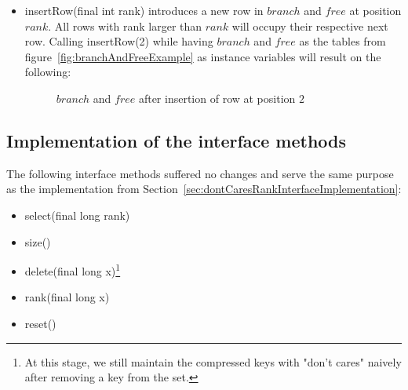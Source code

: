 \begin{itemize}
    \item
    {\ttfamily insertRow(final int rank)} introduces a new row in $branch$ and $free$ at position $rank$. All rows with rank larger than $rank$ will occupy their respective next row. Calling {\ttfamily insertRow(2)} while having $branch$ and $free$ as the tables from figure~\ref{fig:branchAndFreeExample} as instance variables will result on the following:
    \begin{figure}[H]
    \centering
    
    \caption[Example of $branch$ and $free$ after insertion of row at position $2$]{$branch$ and $free$ after insertion of row at position $2$}
    \label{fig:branchAndFreeAfterRowInsertion}
    \end{figure}
\end{itemize}

\subsection{Implementation of the interface methods}  \label{sec:dontCaresInsertInterfaceImplementation}

The following interface methods suffered no changes and serve the same purpose as the implementation from Section~\ref{sec:dontCaresRankInterfaceImplementation}:
\begin{itemize}
    \item
    {\ttfamily select(final long rank)}
    
    \item
    {\ttfamily size()}
    
    \item
    {\ttfamily delete(final long x)}\footnote{At this stage, we still maintain the compressed keys with "don't cares" naively after removing a key from the set.}
    
    \item
    {\ttfamily rank(final long x)}
    
    \item
    {\ttfamily reset()}
\end{itemize}

